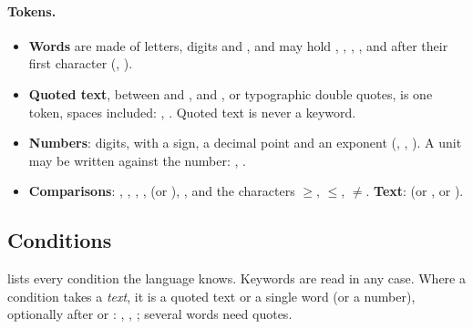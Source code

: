 \paragraph{Tokens.}
\begin{itemize}
\item \textbf{Words} are made of letters, digits and \code{\_}, and may hold , \code{-},
  \code{/}, \code{\%}, \code{\textmu} and \code{\textdegree} after their first character
  (, ).
\item \textbf{Quoted text}, between  and ,  and , or typographic
  double quotes, is one token, spaces included: , .
  Quoted text is never a keyword.
\item \textbf{Numbers}: digits, with a sign, a decimal point and an exponent
  (, , ). A unit may be written against the number:
  , .
\item \textbf{Comparisons}: \code{>}, \code{<}, \code{>=}, \code{<=}, \code{=} (or \code{==}),
  \code{!=}, and the characters $\geq$, $\leq$, $\neq$. \textbf{Text}:  (or
  , or \code{\textasciitilde}).
\end{itemize}

\subsection{Conditions}
\label{sec:cohorts-conditions}

 lists every condition the language knows. Keywords are read in any
case. Where a condition takes a \emph{text}, it is a quoted text or a single word (or a number),
optionally after \code{=} or : , ,
; several words need quotes.


